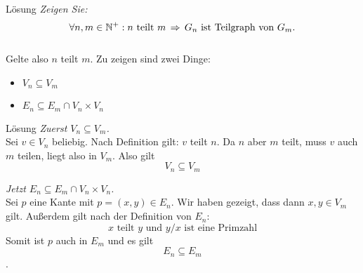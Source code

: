 {\begin{frame}{Lösung}
	\textit{Zeigen Sie: $$\forall n, m \in \N^+: n \text{ teilt } m \impl G_n \text{ ist Teilgraph von } G_m.$$}\\[2em] \pause
	Gelte also $n$ teilt $m$. Zu zeigen sind zwei Dinge:
	\begin{itemize}
		\item $V_n \subseteq V_m$
		\item $E_n \subseteq E_m \cap V_n \times V_n$
	\end{itemize}
	
\end{frame}

\begin{frame}{Lösung}
	\textit{Zuerst $V_n \subseteq V_m$.} \\[1em] \pause
	Sei $v \in V_n$ beliebig. Nach Definition gilt: $v$ teilt $n$. Da $n$ aber $m$ teilt, muss $v$ auch $m$ teilen, liegt also in $V_m$. Also gilt $$V_n \subseteq V_m$$ \pause
	
	\textit{Jetzt $E_n \subseteq E_m \cap V_n \times V_n$.} \\[1em] \pause
	Sei $p$ eine Kante mit $p = (x,y) \in E_n$. Wir haben gezeigt, dass dann $x,y \in V_m$ gilt. Außerdem gilt nach der Definition von $E_n$: $$x \text{ teilt } y \text{ und } y/x \text{ ist eine Primzahl}$$ Somit ist $p$ auch in $E_m$ und es gilt $$E_n \subseteq E_m$$.
\end{frame}
}